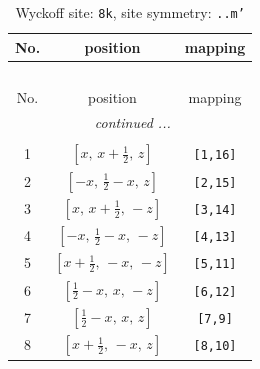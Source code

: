 \documentclass[fleqn,8pt]{jsarticle}
\begin{document}
\begin{longtable}{ccc}
\caption{Wyckoff site: {\tt 8k}, site symmetry: {\tt ..m'}}
 \\
 \hline \hline
No. & position & mapping \\ \hline \endfirsthead

\multicolumn{2}{l}{\tablename\ \thetable{}} \\
 \hline \hline
No. & position & mapping \\ \hline \endhead

 \hline \hline
\multicolumn{2}{r}{\footnotesize\it continued ...} \\ \endfoot

 \hline \hline
\multicolumn{2}{r}{} \\ \endlastfoot

1 & $\left[ x,\, x + \frac{1}{2},\, z \right]$ & {\tt [1,16]} \\ \hline
2 & $\left[ - x,\, \frac{1}{2} - x,\, z \right]$ & {\tt [2,15]} \\ \hline
3 & $\left[ x,\, x + \frac{1}{2},\, - z \right]$ & {\tt [3,14]} \\ \hline
4 & $\left[ - x,\, \frac{1}{2} - x,\, - z \right]$ & {\tt [4,13]} \\ \hline
5 & $\left[ x + \frac{1}{2},\, - x,\, - z \right]$ & {\tt [5,11]} \\ \hline
6 & $\left[ \frac{1}{2} - x,\, x,\, - z \right]$ & {\tt [6,12]} \\ \hline
7 & $\left[ \frac{1}{2} - x,\, x,\, z \right]$ & {\tt [7,9]} \\ \hline
8 & $\left[ x + \frac{1}{2},\, - x,\, z \right]$ & {\tt [8,10]} \\
\end{longtable}
\renewcommand{\arraystretch}{1.2}
\end{document}
